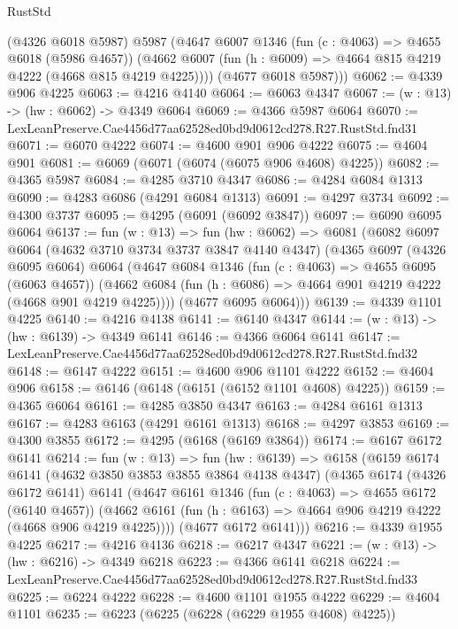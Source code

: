 \begin{lexlean}{RustStd}
\begin{coremodule}
        (@4326 @6018 @5987)
        @5987
        (@4647
          @6007
          @1346
          (fun (c : @4063) => @4655 @6018 (@5986 @4657))
          (@4662 @6007 (fun (h : @6009) => @4664 @815 @4219 @4222 (@4668 @815 @4219 @4225))))
        (@4677 @6018 @5987)))
@6062 := @4339 @906 @4225
@6063 := @4216 @4140
@6064 := @6063 @4347
@6067 := (w : @13) -> (hw : @6062) -> @4349 @6064
@6069 := @4366 @5987 @6064
@6070 := LexLeanPreserve.Cae4456d77aa62528ed0bd9d0612cd278.R27.RustStd.fnd31
@6071 := @6070 @4222
@6074 := @4600 @901 @906 @4222
@6075 := @4604 @901
@6081 := @6069 (@6071 (@6074 (@6075 @906 @4608) @4225))
@6082 := @4365 @5987
@6084 := @4285 @3710 @4347
@6086 := @4284 @6084 @1313
@6090 := @4283 @6086 (@4291 @6084 @1313)
@6091 := @4297 @3734
@6092 := @4300 @3737
@6095 := @4295 (@6091 (@6092 @3847))
@6097 := @6090 @6095 @6064
@6137 := fun (w : @13) =>
  fun (hw : @6062) =>
  @6081
    (@6082
      @6097
      @6064
      (@4632 @3710 @3734 @3737 @3847 @4140 @4347)
      (@4365
        @6097
        (@4326 @6095 @6064)
        @6064
        (@4647
          @6084
          @1346
          (fun (c : @4063) => @4655 @6095 (@6063 @4657))
          (@4662 @6084 (fun (h : @6086) => @4664 @901 @4219 @4222 (@4668 @901 @4219 @4225))))
        (@4677 @6095 @6064)))
@6139 := @4339 @1101 @4225
@6140 := @4216 @4138
@6141 := @6140 @4347
@6144 := (w : @13) -> (hw : @6139) -> @4349 @6141
@6146 := @4366 @6064 @6141
@6147 := LexLeanPreserve.Cae4456d77aa62528ed0bd9d0612cd278.R27.RustStd.fnd32
@6148 := @6147 @4222
@6151 := @4600 @906 @1101 @4222
@6152 := @4604 @906
@6158 := @6146 (@6148 (@6151 (@6152 @1101 @4608) @4225))
@6159 := @4365 @6064
@6161 := @4285 @3850 @4347
@6163 := @4284 @6161 @1313
@6167 := @4283 @6163 (@4291 @6161 @1313)
@6168 := @4297 @3853
@6169 := @4300 @3855
@6172 := @4295 (@6168 (@6169 @3864))
@6174 := @6167 @6172 @6141
@6214 := fun (w : @13) =>
  fun (hw : @6139) =>
  @6158
    (@6159
      @6174
      @6141
      (@4632 @3850 @3853 @3855 @3864 @4138 @4347)
      (@4365
        @6174
        (@4326 @6172 @6141)
        @6141
        (@4647
          @6161
          @1346
          (fun (c : @4063) => @4655 @6172 (@6140 @4657))
          (@4662 @6161 (fun (h : @6163) => @4664 @906 @4219 @4222 (@4668 @906 @4219 @4225))))
        (@4677 @6172 @6141)))
@6216 := @4339 @1955 @4225
@6217 := @4216 @4136
@6218 := @6217 @4347
@6221 := (w : @13) -> (hw : @6216) -> @4349 @6218
@6223 := @4366 @6141 @6218
@6224 := LexLeanPreserve.Cae4456d77aa62528ed0bd9d0612cd278.R27.RustStd.fnd33
@6225 := @6224 @4222
@6228 := @4600 @1101 @1955 @4222
@6229 := @4604 @1101
@6235 := @6223 (@6225 (@6228 (@6229 @1955 @4608) @4225))

\end{coremodule}
\end{lexlean}
